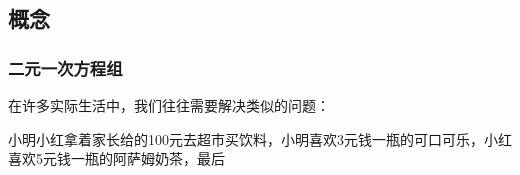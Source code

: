 
\subsection{概念}
\subsubsection{二元一次方程组}
在许多实际生活中，我们往往需要解决类似的问题：

小明小红拿着家长给的100元去超市买饮料，小明喜欢3元钱一瓶的可口可乐，小红喜欢5元钱一瓶的阿萨姆奶茶，最后